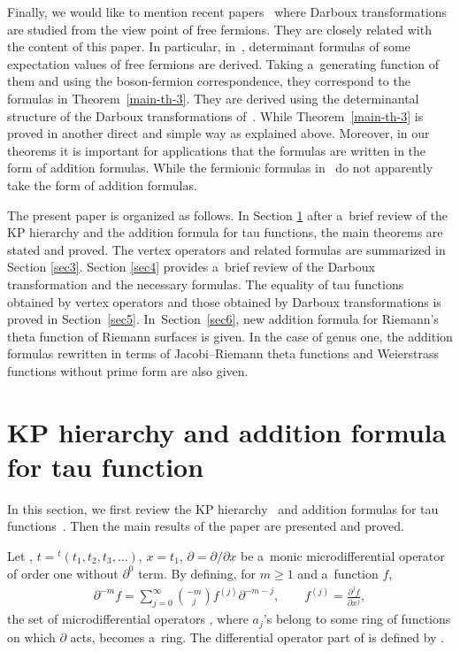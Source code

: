 \documentclass[10pt,a4paper]{amsart}
\numberwithin{equation}{section}
\theoremstyle{definition}
\begin{document}
 Finally, we would like to mention recent papers~\cite{Wang-Chen-Cheng2025,Zabrodin2025}
 where Darboux transformations are studied from the view point of free fermions.
They are closely related with the content of this paper.
 In particular, in~\cite{Wang-Chen-Cheng2025}, determinant formulas of some expectation values of free fermions are derived. Taking a~generating function of them and using the boson-fermion correspondence, they correspond to the formulas in Theorem~\ref{main-th-3}.
 They are derived using the determinantal structure of the Darboux transformations of~\cite{He-Li-Cheng2002}.
While Theorem~\ref{main-th-3} is proved in another direct and simple way as explained above.
Moreover, in our theorems it is important for applications that the formulas are
written in the form of addition formulas. While the fermionic formulas
 in~\cite{Wang-Chen-Cheng2025} do not apparently take the form of addition formulas.



The present paper is organized as follows.
In Section \ref{sec2} after a~brief review of the KP hierarchy and the addition formula
for tau functions, the main theorems are stated and proved.
The vertex operators and related formulas are summarized in Section \ref{sec3}.
Section \ref{sec4} provides a~brief review of the Darboux transformation and the necessary formulas.
The equality of tau functions obtained by vertex operators and those obtained by Darboux transformations is proved in Section~\ref{sec5}.
In~Section~\ref{sec6}, new addition formula for Riemann's theta function of Riemann surfaces
is given. In the case of genus one, the addition formulas rewritten in terms of Jacobi--Riemann theta functions and Weierstrass functions without prime form are also given.




\section{KP hierarchy and addition formula for tau function}\label{sec2}
In this section, we first review the KP hierarchy~\cite{DJKM, Sato1981, SS} and addition formulas for
tau functions~\cite{SS,Shigyo2013}.
Then the main results of the paper are presented and proved.

Let
,
$
t={}^t(t_1,t_2,t_3,\dots )$,
$
x=t_1$,
$
\partial=\partial/\partial x
$
be a~monic microdifferential operator of order one without $\partial^0$ term.
By defining, for $m\geq 1$ and a~function $f$,
\begin{gather*}
\partial^{-m}f=\sum_{j=0}^\infty \binom{-m}{j}f^{(j)}\partial^{-m-j},
\qquad
f^{(j)}=\frac{\partial^j f}{\partial x^j},
\end{gather*}
the set of microdifferential operators ,
where $a_j$'s belong to some ring of functions on which $\partial$ acts, becomes a~ring.
The differential operator part of  is defined by
.
\end{document}
